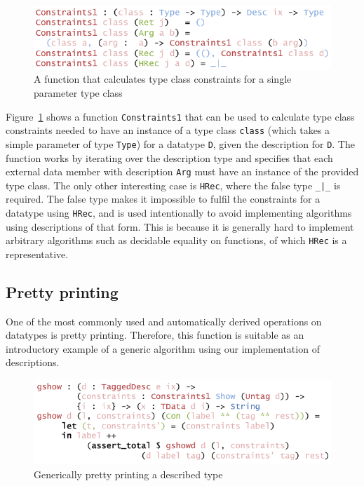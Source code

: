 \documentclass{ituthesis}
\newcommand{\ttconstructor}[1]{\textcolor{constructor-color}{\texttt{#1}}}
\newcommand{\tttype}[1]{\textcolor{type-color}{\texttt{#1}}}
\newcommand{\ttdec}[1]{\textcolor{declared-var-color}{\texttt{#1}}}
\newcommand{\ttvar}[1]{\textcolor{local-var-color}{\texttt{#1}}}
\theoremstyle{break}
\begin{document}
\begin{figure}[ht]
\begin{center}
    \includegraphics[scale=0.5]{Figures/ConstrainingTypeclasses.png}
\end{center}
\caption{A function that calculates type class constraints for a single parameter type class}
\label{fig:constrclass}
\end{figure}

Figure~\ref{fig:constrclass} shows a function \ttdec{Constraints1} that can be used to calculate type class constraints needed to have an instance of a type class \ttvar{class} (which takes a simple parameter of type \tttype{Type}) for a datatype \tttype{D}, given the description for \tttype{D}.
The function works by iterating over the description type and specifies that each external data member with description \ttconstructor{Arg}
must have an instance of the provided type class.
The only other interesting case is \ttconstructor{HRec}, where the false type \tttype{\_|\_} is required.
The false type makes it impossible to fulfil the constraints for a datatype using \ttconstructor{HRec}, and is used intentionally to avoid implementing algorithms using descriptions of that form.
This is because it is generally hard to implement arbitrary algorithms such as decidable equality on functions, of which \ttconstructor{HRec} is a representative.

\subsection{Pretty printing}
\label{sub:Pretty printing}
One of the most commonly used and automatically derived operations on datatypes is pretty printing.
Therefore, this function is suitable as an introductory example of a generic algorithm using our implementation of descriptions.

\begin{figure}[ht]
\begin{center}
    \includegraphics[scale=0.5]{Figures/GenericShow.png}
\end{center}
\caption{Generically pretty printing a described type}
\label{fig:showgen}
\end{figure}
\end{document}
